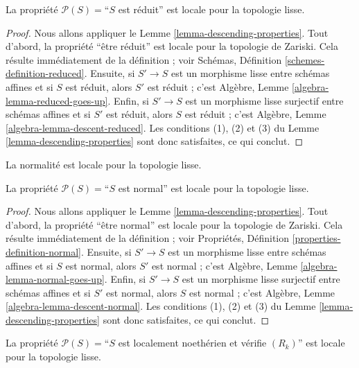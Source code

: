 \begin{lemma}
\label{lemma-reduced-local-smooth}
La propriété $\mathcal{P}(S) =$``$S$ est réduit'' est locale pour la topologie
lisse.
\end{lemma}

\begin{proof}
Nous allons appliquer le Lemme \ref{lemma-descending-properties}.
Tout d'abord, la propriété ``être réduit'' est locale pour la topologie de
Zariski. Cela résulte immédiatement de la définition ; voir Schémas,
Définition \ref{schemes-definition-reduced}. Ensuite, si $S' \to S$ est un
morphisme lisse entre schémas affines et si $S$ est réduit, alors $S'$ est
réduit ; c'est Algèbre, Lemme \ref{algebra-lemma-reduced-goes-up}.
Enfin, si $S' \to S$ est un morphisme lisse surjectif entre schémas affines
et si $S'$ est réduit, alors $S$ est réduit ; c'est Algèbre, Lemme
\ref{algebra-lemma-descent-reduced}. Les conditions (1), (2) et (3) du
Lemme \ref{lemma-descending-properties} sont donc satisfaites, ce qui conclut.
\end{proof}

\begin{lemma}
\label{lemma-normal-local-smooth}
\begin{slogan}
La normalité est locale pour la topologie lisse.
\end{slogan}
La propriété $\mathcal{P}(S) =$``$S$ est normal'' est locale pour la topologie
lisse.
\end{lemma}

\begin{proof}
Nous allons appliquer le Lemme \ref{lemma-descending-properties}.
Tout d'abord, la propriété ``être normal'' est locale pour la topologie de
Zariski. Cela résulte immédiatement de la définition ; voir Propriétés,
Définition \ref{properties-definition-normal}. Ensuite, si $S' \to S$ est
un morphisme lisse entre schémas affines et si $S$ est normal, alors $S'$ est
normal ; c'est Algèbre, Lemme \ref{algebra-lemma-normal-goes-up}. Enfin, si
$S' \to S$ est un morphisme lisse surjectif entre schémas affines et si $S'$
est normal, alors $S$ est normal ; c'est Algèbre, Lemme
\ref{algebra-lemma-descent-normal}. Les conditions (1), (2) et (3) du
Lemme \ref{lemma-descending-properties} sont donc satisfaites, ce qui conclut.
\end{proof}

\begin{lemma}
\label{lemma-Rk-local-smooth}
La propriété $\mathcal{P}(S) =$``$S$ est localement noethérien et vérifie
$(R_k)$'' est locale pour la topologie lisse.
\end{lemma}

